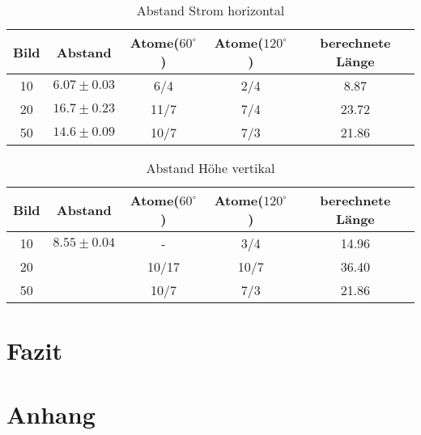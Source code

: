 \documentclass[12pt,a4paper]{article}
\begin{document}
\begin{table}
\begin{tabular}{|c|c||c|c||c|}
\hline 
Bild & Abstand & Atome($60^{\circ}$) & Atome($120^{\circ}$) & berechnete Länge \\ 
\hline 
10 & $6.07\pm 0.03$ & 6/4 & 2/4 & 8.87\\ 
\hline 
20 & $16.7\pm 0.23$ & 11/7  & 7/4 & 23.72\\ 
\hline 
50 & $14.6\pm 0.09$ & 10/7  & 7/3 & 21.86\\ 
\hline 
\end{tabular} 
\caption{Abstand Strom horizontal}
\label{test}
\end{table}

\begin{table}
\begin{tabular}{|c|c||c|c||c|}
\hline 
Bild & Abstand & Atome($60^{\circ}$) & Atome($120^{\circ}$) & berechnete Länge \\ 
\hline 
10 & $8.55\pm 0.04$ & - & 3/4 & 14.96\\ 
\hline 
20 & $ $ & 10/17  & 10/7 & 36.40\\ 
\hline 
50 & $ $ & 10/7  & 7/3 & 21.86\\ 
\hline 
\end{tabular} 
\caption{Abstand Höhe vertikal}
\label{test}
\end{table}

\section{Fazit}

\section{Anhang}
\end{document}
